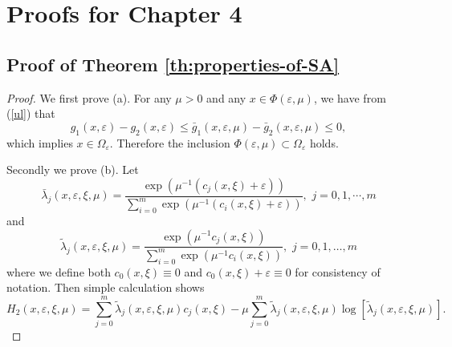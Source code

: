 \chapter{Proofs for Chapter 4}\label{c4:appendix}



\section{Proof of Theorem \ref{th:properties-of-SA}}

\begin{proof}
We first prove (a). For any $\mu>0$ and any $x\in
\Phi(\varepsilon,\mu)$, we have from (\ref{ul}) that
\begin{equation*}
g_1(x,\varepsilon)-g_2(x,\varepsilon)\le \bar
g_1(x,\varepsilon,\mu)-\bar g_2(x,\varepsilon,\mu)\le 0,
\end{equation*}
which implies $x\in\Omega_{\varepsilon}$. Therefore the inclusion
$\Phi(\varepsilon,\mu)\subset \Omega_\varepsilon$ holds.

Secondly we prove (b). Let
\begin{equation}\label{lambar}
\bar\lambda_j(x,\varepsilon,\xi,\mu)=\displaystyle
\frac{\exp\left(\mu^{-1}\left(c_j(x,\xi)+\varepsilon\right)\right)}{\displaystyle
\sum_{i=0}^m\exp\left(\mu^{-1}\left(c_i(x,\xi)+\varepsilon\right)\right)},\,\,j=0,1,\cdots,m
\end{equation}
and
\begin{equation*}
\widetilde \lambda_j(x,\varepsilon,\xi,\mu)=\displaystyle
\frac{\exp\left(\mu^{-1}c_{j}(x,\xi)\right)}{\displaystyle
\sum_{i=0}^m\exp\left(\mu^{-1}c_{i}(x,\xi)\right)},\,\,j=0,1,\ldots,m
\end{equation*}
where we define both $c_0(x,\xi)\equiv0$ and
$c_0(x,\xi)+\varepsilon\equiv0$ for consistency of notation. Then
simple calculation shows
\[H_2(x,\varepsilon,\xi,\mu)=\displaystyle \sum_{j=0}^m\widetilde
\lambda_j(x,\varepsilon,\xi,\mu)c_{j}(x,\xi)-\mu\displaystyle
\sum_{j=0}^m\widetilde\lambda_j(x,\varepsilon,\xi,\mu)
\log[\widetilde \lambda_j(x,\varepsilon,\xi,\mu)].\]


\end{proof}
